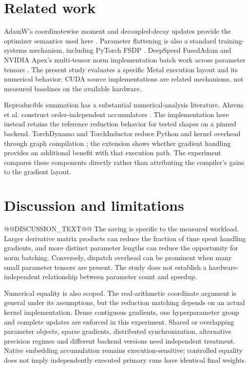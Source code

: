 \documentclass[11pt]{article}
\begin{document}
\section{Related work}
AdamW's coordinatewise moment and decoupled-decay updates provide the optimizer
semantics used here \cite{adamw}. Parameter flattening is also a standard
training-systems mechanism, including PyTorch FSDP \cite{fsdp}. DeepSpeed
FusedAdam and NVIDIA Apex's multi-tensor norm implementation batch work across
parameter tensors \cite{deepspeed,apex}. The present study evaluates a specific
Metal execution layout and its numerical behavior; CUDA source implementations
are related mechanisms, not measured baselines on the available hardware.

Reproducible summation has a substantial numerical-analysis literature.
Ahrens et al. construct order-independent accumulators \cite{repro}.
The implementation here instead retains the reference reduction behavior for
tested shapes on a pinned backend. TorchDynamo and TorchInductor reduce Python
and kernel overhead through graph compilation \cite{pytorch2}; the extension
shows whether gradient handling provides an additional benefit with that
execution path. The experiment compares these components directly rather than
attributing the compiler's gains to the gradient layout.

\section{Discussion and limitations}
@@DISCUSSION_TEXT@@
The saving is specific to the measured workload. Larger derivative matrix
products can reduce the fraction of time spent handling gradients, and more
distinct parameter lengths can reduce the opportunity for norm batching.
Conversely, dispatch overhead can be prominent when many small parameter
tensors are present. The study does not establish a hardware-independent
relationship between parameter count and speedup.

Numerical equality is also scoped. The real-arithmetic coordinate argument is
general under its assumptions, but the reduction matching depends on an actual
kernel implementation. Dense contiguous gradients, one hyperparameter group
and complete updates are enforced in this experiment. Shared or overlapping
parameter objects, sparse gradients, distributed synchronization, alternative
precision regimes and different backend versions need independent treatment.
Native embedding accumulation remains execution-sensitive; controlled equality
does not imply independently executed primary runs have identical final weights.
\end{document}
